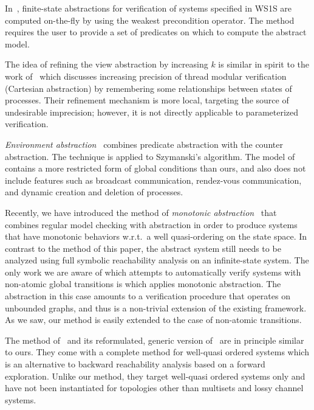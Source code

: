 In~\cite{BLS02}, finite-state abstractions for verification of systems
specified in WS1S are computed on-the-fly by using the weakest
precondition operator. The method requires the user to provide a set
of predicates on which to compute the abstract model.
%

The idea of refining the view abstraction by increasing $k$ is similar in spirit to the work of~\cite{MalkisPR07} which discusses increasing precision of thread modular verification (Cartesian abstraction) by remembering some relationships between states of processes.
Their refinement mechanism is more local, targeting the source of undesirable imprecision; however, it is not directly applicable to parameterized verification. 

{\em Environment abstraction}~\cite{CTV06} combines predicate
abstraction with the counter abstraction. The technique is applied to
Szymanski's algorithm. The model of~\cite{CTV06} contains a more
restricted form of global conditions than ours, and also does not
include features such as broadcast communication, rendez-vous
communication, and dynamic creation and deletion of processes.

Recently, we have introduced the method of {\it monotonic
  abstraction}~\cite{rmc:wo:transducers} that combines regular model
checking with abstraction in order to produce systems that have
monotonic behaviors w.r.t.\ a well quasi-ordering on the state space.
%
%
In contrast to the method of this paper, the abstract system still
needs to be analyzed using full symbolic reachability analysis on an
infinite-state system.
%
The only work we are aware of which attempts to automatically verify systems
with non-atomic global transitions is \cite{parosh:non-atomic} which applies monotonic abstraction.
%
The abstraction in this case 
amounts to a verification procedure that operates on unbounded
graphs, and thus is a non-trivial extension of the existing framework.
%
As we saw, our method is easily extended to the case of non-atomic
transitions.

The method of~\cite{Raskin:Viagra,Raskin:experiments:German} and its
reformulated, generic version of~\cite{Ganty:Complete} are in
principle similar to ours.  They come with a complete method for
well-quasi ordered systems which is an alternative to backward
reachability analysis based on a forward exploration.
%
Unlike our method, they target well-quasi ordered systems only and
have not been instantiated for topologies other than multisets and
lossy channel systems.

